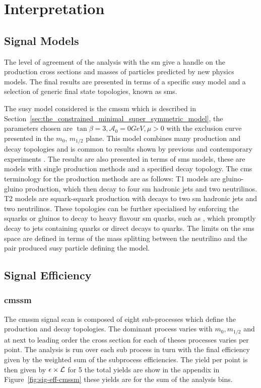 \chapter{Interpretation} %
\label{cha:interpretation}


\section{Signal Models} %
\label{sec:signal_models}
The level of agreement of the analysis with the \ac{sm} give a handle on the 
production cross sections and masses of particles predicted by new physics 
models. The final results are presented in terms of a specific \ac{susy} model 
and a selection of generic final state topologies, known as \ac{sms}.

The \ac{susy} model considered is the \ac{cmssm}\cite{} which is described 
in Section~\ref{sec:the_constrained_minimal_super_symmetric_model}, the 
parameters chosen are $\tan\beta = 3, \mathcal{A}_{0} = 0 GeV, \mu > 0$ with 
the exclusion curve presented in the $m_{0}$, $m_{1/2}$ plane. This model 
combines many production and decay topologies and is common to results shown by 
previous and contemporary experiments \cite{} .
The results are also presented in terms of \ac{sms}\cite{} models, these are 
models with single production methods and a specified decay topology. The 
\ac{cms} terminology for the production methods are as follows: T1 models are 
gluino-gluino production, which then decay to four \ac{sm} hadronic jets and 
two neutrilinos. T2 models are squark-squark production with decays to two 
\ac{sm} hadronic jets and two neutrilinos.
These topologies can be further specialised by enforcing the squarks or gluinos 
to decay to heavy flavour \ac{sm} quarks, such as \Ptop, which promptly decay 
to jets containing \Pbottom quarks or direct decays to \Pbottom quarks. The 
limits on the \ac{sms} space are defined in terms of the mass splitting between 
the neutrilino and the pair produced \ac{susy} particle defining the model.
\section{Signal Efficiency} %
\label{sub:signal_efficiency}
\subsection{\ac{cmssm}} %
\label{par:cmssm}
The \ac{cmssm} signal scan is composed of eight sub-processes which define the 
production and decay topologies. The dominant process varies with $m_{0}, 
m_{1/2}$ and at next to leading order the cross section for each of theses 
processes varies per point. The analysis is run over each sub process in turn 
with the final efficiency given by the weighted sum of the subprocess 
efficiencies. The yield per point is then given by 
$\epsilon\time\sigma\times\mathcal{L}$ for \unit{5}{\invfb} the total yields 
are show in the appendix in Figure~\ref{fig:sig-eff-cmssm} these yields are for 
the sum of the \HT analysis bins.

